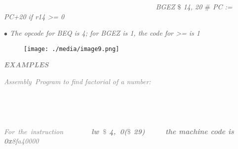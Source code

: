 \documentclass[12pt]{article}
\begin{document}
\textit{\textcolor[HTML]{525252}{\ \ \ \ \ \ \ \ \ \  \tab \ \ \ \ \ \ \ \ \ \ \ \ \ \ \ \ \ \ \ \ \ \ \ \ \ \ \ \ \ \ \ \ \  BGEZ $\$$ 14, 20 $\#$  PC := PC+20 if r14 >= 0 }}\par

\textit{\textcolor[HTML]{525252}{$\bullet$  The opcode for BEQ is 4; for BGEZ is 1, the code for >= is 1}}\par




\begin{figure}[H]
	\begin{Center}
		\texttt{[image: ./media/image9.png]}
	\end{Center}
\end{figure}



\par

{\fontsize{16pt}{19.2pt}\selectfont \textbf{\textit{\textcolor[HTML]{808080}{EXAMPLES}}}\par}\par

\textit{\textcolor[HTML]{808080}{Assembly\ Program to find factorial of a number:  }}\par





\begin{figure}[H]	\begin{subfigure}		\texttt{[image: ./media/image10.png]}
	\end{subfigure}
~	\begin{subfigure}		\texttt{[image: ./media/image11.png]}
	\end{subfigure}
~
\end{figure}



\par

\textit{\textcolor[HTML]{7F7F7F}{For\ the\ instruction\ \ \ \ \ \ \ \    \textbf{lw\ $\$$ 4,\ 0($\$$ 29)\ \ \ \ \ the machine code is    0x}8fa40000}}\par
\end{document}
